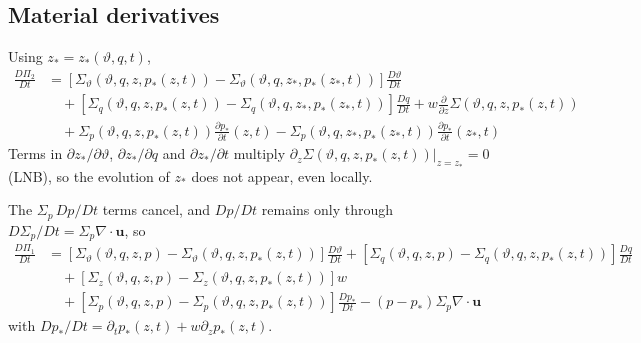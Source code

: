 \documentclass{article}
\begin{document}
\subsection{Material derivatives}
Using \(z_* = z_*(\vartheta, q, t)\),
\begin{align}
    \frac{D \Pi_2}{D t}
    & =
    \left[
        \Sigma_\vartheta(\vartheta, q, z, p_*(z, t))
        - \Sigma_\vartheta(\vartheta, q, z_*, p_*(z_*, t))
    \right]
    \frac{D \vartheta}{D t}
    \nonumber
    \\
    & \quad
    + \left[
        \Sigma_q(\vartheta, q, z, p_*(z, t))
        - \Sigma_q(\vartheta, q, z_*, p_*(z_*, t))
    \right]
    \frac{D q}{D t}
    + w \frac{\partial}{\partial z} \Sigma(\vartheta, q, z, p_*(z, t))
    \nonumber
    \\
    & \quad
    + \Sigma_p(\vartheta, q, z, p_*(z, t)) \frac{\partial p_*}{\partial t}(z, t)
    - \Sigma_p(\vartheta, q, z_*, p_*(z_*, t)) \frac{\partial p_*}{\partial t}(z_*, t)
\end{align}
Terms in \(\partial z_* / \partial \vartheta\), \(\partial z_* / \partial q\) and \(\partial z_* / \partial t\) multiply \(\partial_z \Sigma(\vartheta, q, z, p_*(z, t))|_{z = z_*} = 0\) (LNB), so the evolution of \(z_*\) does not appear, even locally.

The \(\Sigma_p \, Dp/Dt\) terms cancel, and \(Dp/Dt\) remains only through \(D \Sigma_p / Dt = \Sigma_p \nabla \cdot \mathbf{u}\), so
\begin{align}
    \frac{D \Pi_1}{D t}
    & =
    \left[
        \Sigma_\vartheta(\vartheta, q, z, p)
        - \Sigma_\vartheta(\vartheta, q, z, p_*(z, t))
    \right]
    \frac{D \vartheta}{D t}
    + \left[
        \Sigma_q(\vartheta, q, z, p)
        - \Sigma_q(\vartheta, q, z, p_*(z, t))
    \right]
    \frac{D q}{D t}
    \nonumber
    \\
    & \quad
    + \left[
        \Sigma_z(\vartheta, q, z, p)
        - \Sigma_z(\vartheta, q, z, p_*(z, t))
    \right] w
    \nonumber
    \\
    & \quad
    + \left[
        \Sigma_p(\vartheta, q, z, p)
        - \Sigma_p(\vartheta, q, z, p_*(z, t))
    \right]
    \frac{D p_*}{D t}
    - (p - p_*) \Sigma_p \nabla \cdot \mathbf{u}
\end{align}
with \(D p_* / D t = \partial_t p_*(z, t) + w \partial_z p_*(z, t)\).
\end{document}
